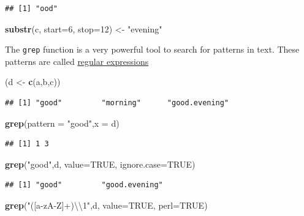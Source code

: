 \documentclass[]{book}
\newenvironment{Shaded}{\begin{snugshade}}{\end{snugshade}}
\newcommand{\KeywordTok}[1]{\textcolor[rgb]{0.13,0.29,0.53}{\textbf{#1}}}
\newcommand{\DataTypeTok}[1]{\textcolor[rgb]{0.13,0.29,0.53}{#1}}
\newcommand{\DecValTok}[1]{\textcolor[rgb]{0.00,0.00,0.81}{#1}}
\newcommand{\CharTok}[1]{\textcolor[rgb]{0.31,0.60,0.02}{#1}}
\newcommand{\StringTok}[1]{\textcolor[rgb]{0.31,0.60,0.02}{#1}}
\newcommand{\OtherTok}[1]{\textcolor[rgb]{0.56,0.35,0.01}{#1}}
\newcommand{\NormalTok}[1]{#1}
\theoremstyle{definition}
\theoremstyle{definition}
\theoremstyle{definition}
\theoremstyle{remark}
\begin{document}
\begin{verbatim}
## [1] "ood"
\end{verbatim}

\begin{Shaded}
\begin{Highlighting}[]
\KeywordTok{substr}\NormalTok{(c, }\DataTypeTok{start=}\DecValTok{6}\NormalTok{, }\DataTypeTok{stop=}\DecValTok{12}\NormalTok{) <-}\StringTok{ "evening"}
\end{Highlighting}
\end{Shaded}

The \texttt{grep} function is a very powerful tool to search for
patterns in text. These patterns are called
\href{https://en.wikipedia.org/wiki/Regular_expression}{regular
expressions}

\begin{Shaded}
\begin{Highlighting}[]
\NormalTok{(d <-}\StringTok{ }\KeywordTok{c}\NormalTok{(a,b,c))}
\end{Highlighting}
\end{Shaded}

\begin{verbatim}
## [1] "good"         "morning"      "good.evening"
\end{verbatim}

\begin{Shaded}
\begin{Highlighting}[]
\KeywordTok{grep}\NormalTok{(}\DataTypeTok{pattern =} \StringTok{"good"}\NormalTok{,}\DataTypeTok{x =}\NormalTok{ d) }
\end{Highlighting}
\end{Shaded}

\begin{verbatim}
## [1] 1 3
\end{verbatim}

\begin{Shaded}
\begin{Highlighting}[]
\KeywordTok{grep}\NormalTok{(}\StringTok{"good"}\NormalTok{,d, }\DataTypeTok{value=}\OtherTok{TRUE}\NormalTok{, }\DataTypeTok{ignore.case=}\OtherTok{TRUE}\NormalTok{) }
\end{Highlighting}
\end{Shaded}

\begin{verbatim}
## [1] "good"         "good.evening"
\end{verbatim}

\begin{Shaded}
\begin{Highlighting}[]
\KeywordTok{grep}\NormalTok{(}\StringTok{"([a-zA-Z]+)}\CharTok{\textbackslash{}\textbackslash{}}\StringTok{1"}\NormalTok{,d, }\DataTypeTok{value=}\OtherTok{TRUE}\NormalTok{, }\DataTypeTok{perl=}\OtherTok{TRUE}\NormalTok{) }
\end{Highlighting}
\end{Shaded}
\end{document}
